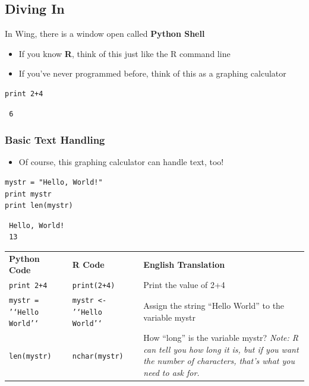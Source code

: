 \documentclass[11pt]{article}
\begin{document}
\subsection{Diving In}
\label{sec-2-3}

   In Wing, there is a window open called \textbf{Python Shell}   
\begin{itemize}
\item If you know \textbf{R}, think of this just like the R command line
\item If you've never programmed before, think of this as a graphing calculator
\end{itemize}

\begin{verbatim}
print 2+4
\end{verbatim}

\begin{verbatim}
 6
\end{verbatim}
\subsubsection{Basic Text Handling}
\label{sec-2-3-1}

\begin{itemize}
\item Of course, this graphing calculator can handle text, too!
\end{itemize}

\begin{verbatim}
mystr = "Hello, World!"
print mystr
print len(mystr)
\end{verbatim}

\begin{verbatim}
 Hello, World!
 13
\end{verbatim}


\begin{center}
\begin{tabular}{lll}
 \textbf{Python Code}              &  \textbf{R Code}                    &  \textbf{English Translation}                                                                                                                                 \\
 \texttt{print 2+4}                &  \texttt{print(2+4)}                &  Print the value of 2+4                                                                                                                                       \\
 \texttt{mystr = '`Hello World'`}  &  \texttt{mystr <- '`Hello World'`}  &  Assign the string ``Hello World'' to the variable mystr                                                                                                      \\
 \texttt{len(mystr)}               &  \texttt{nchar(mystr)}              &  How ``long'' is the variable mystr?  \emph{Note: R can tell you how long it is, but if you want the number of characters, that's what you need to ask for.}  \\
\end{tabular}
\end{center}
\end{document}
